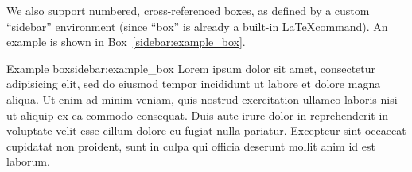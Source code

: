 We also support numbered, cross-referenced boxes, as defined by a custom ``sidebar'' environment (since ``box'' is already a built-in \LaTeX command). An example is shown in Box~\ref{sidebar:example_box}.

\begin{sidebar}{Example box}{sidebar:example_box}
Lorem ipsum dolor sit amet, consectetur adipisicing elit, sed do eiusmod
tempor incididunt ut labore et dolore magna aliqua. Ut enim ad minim veniam,
quis nostrud exercitation ullamco laboris nisi ut aliquip ex ea commodo
consequat. Duis aute irure dolor in reprehenderit in voluptate velit esse
cillum dolore eu fugiat nulla pariatur. Excepteur sint occaecat cupidatat non
proident, sunt in culpa qui officia deserunt mollit anim id est laborum.
\end{sidebar}